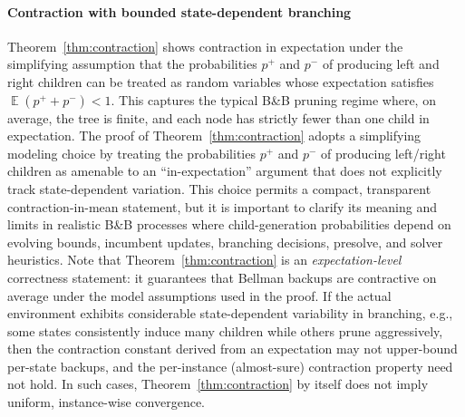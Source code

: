 \documentclass[preprint,12pt]{elsarticle} %
\theoremstyle{plain}
\theoremstyle{definition}
\theoremstyle{remark}
\newcommand{\ex}{\mathop{\mathbb{E}}}
\begin{document}

\paragraph{Contraction with bounded state-dependent branching}

Theorem~\ref{thm:contraction} shows contraction in expectation under the simplifying assumption that the probabilities $p^+$ and $p^-$ of producing left and right children can be treated as random variables whose expectation satisfies $\ex (p^+ + p^-) < 1$. This captures the typical B\&B pruning regime where, on average, the tree is finite, and each node has strictly fewer than one child in expectation. The proof of Theorem~\ref{thm:contraction} adopts a simplifying modeling choice by treating the probabilities $p^+$ and $p^-$ of producing left/right children as amenable to an ``in-expectation'' argument that does not explicitly track state-dependent variation. This choice permits a compact, transparent contraction-in-mean statement, but it is important to clarify its meaning and limits in realistic B\&B processes where child-generation probabilities depend on evolving bounds, incumbent updates, branching decisions, presolve, and solver heuristics. Note that Theorem~\ref{thm:contraction} is an \emph{expectation-level} correctness statement: it guarantees that Bellman backups are contractive on average under the model assumptions used in the proof. 
If the actual environment exhibits considerable state-dependent variability in branching, e.g., some states consistently induce many children while others prune aggressively, then the contraction constant derived from an expectation may not upper-bound per-state
backups, and the per-instance (almost-sure) contraction property need not hold. In such cases, Theorem~\ref{thm:contraction} by itself does not imply uniform, instance-wise convergence.
\end{document}
